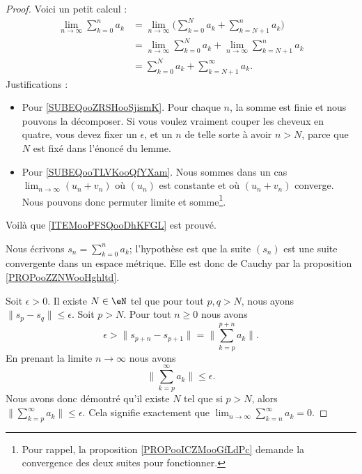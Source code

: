 \begin{proof}
	Voici un petit calcul :
	\begin{subequations}
		\begin{align}
			\lim_{n\to \infty} \sum_{k=0}^na_k & =\lim_{n\to \infty} \big( \sum_{k=0}^Na_k+\sum_{k=N+1}^{n}a_k \big)      \label{SUBEQooZRSHooSjismK}           \\
			                                   & =\lim_{n\to \infty} \sum_{k=0}^{N}a_k+\lim_{n\to \infty} \sum_{k=N+1}^{n}a_k       \label{SUBEQooTLVKooQfYXam} \\
			                                   & =\sum_{k=0}^Na_k+\sum_{k=N+1}^{\infty}a_k.
		\end{align}
	\end{subequations}
	Justifications :
	\begin{itemize}
		\item Pour \eqref{SUBEQooZRSHooSjismK}. Pour chaque \( n\), la somme est finie et nous pouvons la décomposer. Si vous voulez vraiment couper les cheveux en quatre, vous devez fixer un \( \epsilon\), et un \( n\) de telle sorte à avoir \( n>N\), parce que \( N\) est fixé dans l'énoncé du lemme.
		\item Pour \eqref{SUBEQooTLVKooQfYXam}. Nous sommes dans un cas \( \lim_{n\to \infty}(u_n+v_n) \) où \( (u_n)\) est constante et où \( (u_n+v_n)\) converge. Nous pouvons donc permuter limite et somme\footnote{Pour rappel, la proposition \ref{PROPooICZMooGfLdPc} demande la convergence des deux suites pour fonctionner.}.
	\end{itemize}
	Voilà que \ref{ITEMooPFSQooDhKFGL} est prouvé.

	Nous écrivons \( s_n=\sum_{k=0}^na_k\); l'hypothèse est que la suite \( (s_n)\) est une suite convergente dans un espace métrique. Elle est donc de Cauchy par la proposition \ref{PROPooZZNWooHghltd}.

	Soit \( \epsilon>0\). Il existe \( N\in \eN\) tel que pour tout \( p,q>N\), nous ayons \( \| s_p-s_q \|\leq \epsilon\). Soit \( p>N\). Pour tout \( n\geq 0\) nous avons
	\begin{equation}
		\epsilon>\| s_{p+n}-s_{p+1} \|=\| \sum_{k=p}^{p+n}a_k \|.
	\end{equation}
	En prenant la limite \( n\to \infty\) nous avons
	\begin{equation}
		\| \sum_{k=p}^{\infty}a_k \|\leq \epsilon.
	\end{equation}
	Nous avons donc démontré qu'il existe \( N\) tel que si \( p>N\), alors \( \| \sum_{k=p}^{\infty}a_k \|\leq \epsilon\). Cela signifie exactement que \( \lim_{n\to \infty} \sum_{k=n}^{\infty}a_k=0\).
\end{proof}


